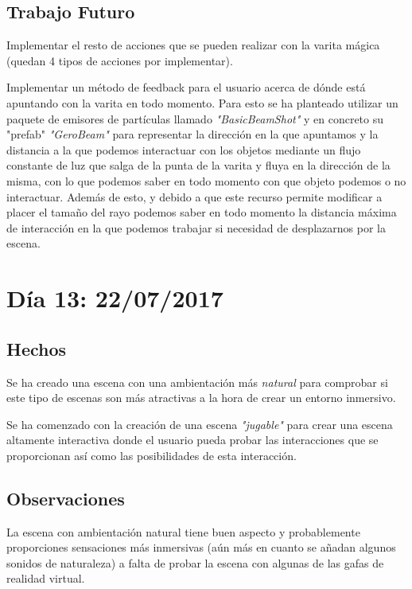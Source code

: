 \documentclass[12pt,a4paper]{article}
\begin{document}
\subsection{Trabajo Futuro}

Implementar el resto de acciones que se pueden realizar con la varita mágica (quedan 4 tipos de acciones por implementar).

Implementar un método de feedback para el usuario acerca de dónde está apuntando con la varita en todo momento. Para esto se ha planteado utilizar un paquete de emisores de partículas llamado \textit{"BasicBeamShot"} y en concreto su "prefab" \textit{"GeroBeam"} para representar la dirección en la que apuntamos y la distancia a la que podemos interactuar con los objetos mediante un flujo constante de luz que salga de la punta de la varita y fluya en la dirección de la misma, con lo que podemos saber en todo momento con que objeto podemos o no interactuar. Además de esto, y debido a que este recurso permite modificar a placer el tamaño del rayo podemos saber en todo momento la distancia máxima de interacción en la que podemos trabajar si necesidad de desplazarnos por la escena.

\section{Día 13: 22/07/2017}

\subsection{Hechos}

Se ha creado una escena con una ambientación más \textit{natural} para comprobar si este tipo de escenas son más atractivas a la hora de crear un entorno inmersivo.

Se ha comenzado con la creación de una escena \textit{"jugable"} para crear una escena altamente interactiva donde el usuario pueda probar las interacciones que se proporcionan así como las posibilidades de esta interacción.

\subsection{Observaciones}

La escena con ambientación natural tiene buen aspecto y probablemente proporciones sensaciones más inmersivas (aún más en cuanto se añadan algunos sonidos de naturaleza) a falta de probar la escena con algunas de las gafas de realidad virtual.
\end{document}
